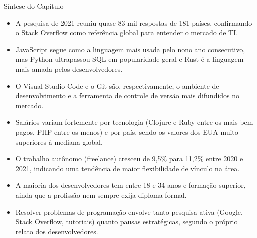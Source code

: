 Síntese do Capítulo

\begin{itemize}
  \item A pesquisa de 2021 reuniu quase 83 mil respostas de 181 países, confirmando o Stack Overflow como referência global para entender o mercado de TI.
\end{itemize}

\begin{itemize}
  \item JavaScript segue como a linguagem mais usada pelo nono ano consecutivo, mas Python ultrapassou SQL em popularidade geral e Rust é a linguagem mais amada pelos desenvolvedores.
\end{itemize}

\begin{itemize}
  \item O Visual Studio Code e o Git são, respectivamente, o ambiente de desenvolvimento e a ferramenta de controle de versão mais difundidos no mercado.
\end{itemize}

\begin{itemize}
  \item Salários variam fortemente por tecnologia (Clojure e Ruby entre os mais bem pagos, PHP entre os menos) e por país, sendo os valores dos EUA muito superiores à mediana global.
\end{itemize}

\begin{itemize}
  \item O trabalho autônomo (freelance) cresceu de 9,5\% para 11,2\% entre 2020 e 2021, indicando uma tendência de maior flexibilidade de vínculo na área.
\end{itemize}

\begin{itemize}
  \item A maioria dos desenvolvedores tem entre 18 e 34 anos e formação superior, ainda que a profissão nem sempre exija diploma formal.
\end{itemize}

\begin{itemize}
  \item Resolver problemas de programação envolve tanto pesquisa ativa (Google, Stack Overflow, tutoriais) quanto pausas estratégicas, segundo o próprio relato dos desenvolvedores.
\end{itemize}
